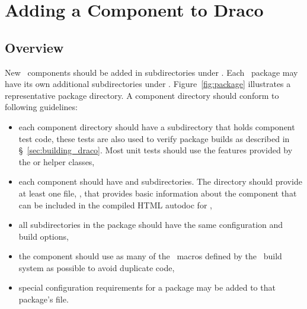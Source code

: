 
\chapter{Adding a Component to Draco}
\label{chap:adding}

\section{Overview}
\label{sec:adding_overview}

New \draco\ components should be added in subdirectories under
.  Each \draco\ package may have its own additional
subdirectories under .
Figure~\ref{fig:package} illustrates a representative package
directory.  A component directory should conform to following
guidelines:
\begin{itemize}
\item each component directory should have a  subdirectory
    that holds component test code, these tests are also used to
    verify package builds as described in \S~\ref{sec:building_draco}. Most unit tests should use the features provided by the  or  helper classes,
\item each component should have   and  subdirectories.  The   directory should provide at least one file, , that provides basic information about the component that can be included in the compiled HTML autodoc for \draco,
\item all subdirectories in the package should have the same configuration and build options,
\item the component should use as many of the \cmake\ macros defined by the \draco\ build system as possible to avoid duplicate code,
\item special configuration requirements for a package may be added to 
  that package's  file.
\end{itemize}

